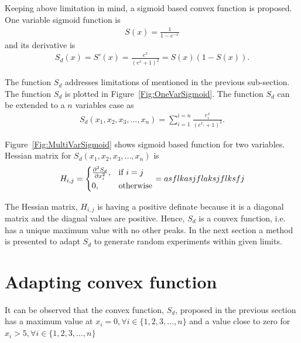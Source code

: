 \documentclass[letterpaper, 12pt]{article}
\begin{document}
	Keeping above limitation in mind, a sigmoid based convex function is proposed. One variable sigmoid function is
	\begin{eqnarray}
	S(x) = \frac{1}{1-e^{-x}} \label{Eqn:Sigmoid}
	\end{eqnarray}
	and its derivative is
	\begin{eqnarray}
	S_d(x) = S'(x) = \frac{e^x}{(e^{x}+1)^2} = S(x)(1-S(x)). \label{Eqn:DiffSigmoid}
	\end{eqnarray}
	\par
	The function $S_d$ addresses limitations of mentioned in the previous sub-section. The function $S_d$ is plotted in Figure~\ref{Fig:OneVarSigmoid}. The function $S_d$ can be extended to a $n$ variables case as
	\begin{eqnarray}
	S_d(x_1, x_2, x_3, ..., x_n) = \sum_{i=1}^{i=n}{\frac{e^x_i}{(e^{x_i}+1)^2}}. \label{Eqn:DiffSigmoidMulti}
	\end{eqnarray}
	\par
	Figure~\ref{Fig:MultiVarSigmoid} shows sigmoid based function for two variables. Hessian matrix for $S_d(x_1, x_2, x_3, ..., x_n)$ is 
	\begin{eqnarray}
	H_{i,j} = 
	\begin{cases}
	\pdv[2]{S_d}{x_i},& \text{if } i = j\\
	0,              & \text{otherwise}
	\end{cases}
	= asflkasjflaksjflksfj \label{Eqn:HessianMatrix}
	\end{eqnarray}
	\par
	The Hessian matrix, $H_{i,j}$ is having a positive definate because it is a diagonal matrix and the diagnal values are positive. Hence, $S_d$ is a convex function, i.e. has a unique maximum value with no other peaks. In the next section a method is presented to adapt $S_d$ to generate random experiments within given limits.
	\section{Adapting convex function}
	It can be observed that the convex function, $S_d$, proposed in the previous section has a maximum value at $x_i=0, \forall i\in\{1, 2, 3, \dots, n\}$ and a value close to zero for $x_i>5, \forall i\in\{1, 2, 3, \dots, n\}$
	
	
	
	
	
	
\end{document}
